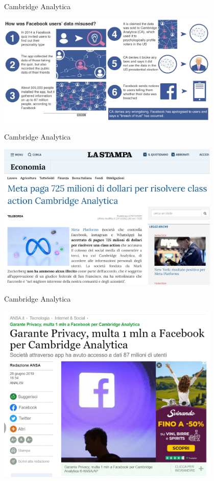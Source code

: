 \documentclass[11pt]{beamer}
\begin{document}
\begin{frame}{Cambridge Analytica \cite{CA_timeline}}

\begin{center}
\includegraphics[width=0.8\textwidth]{Pic/cambridge_analitica_timeline.png}
\end{center}

\end{frame}


\begin{frame}{Cambridge Analytica \cite{CA_it2}}

\begin{center}
\includegraphics[width=0.8\textwidth]{Pic/FB_CA.png}
\end{center}

\end{frame}

\begin{frame}{Cambridge Analytica \cite{CA_it}}

\begin{center}
\includegraphics[width=0.8\textwidth]{Pic/FA_CA_ITA.png}
\end{center}

\end{frame}
\end{document}
